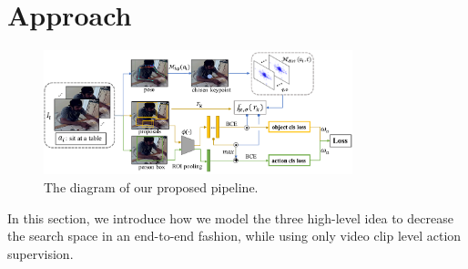 \section{Approach}
\label{sec:approach}

\begin{figure}[ht!]
\centering
\includegraphics[width=0.8\textwidth]{figures/pipeline.pdf}
\caption{The diagram of our proposed pipeline.}
\label{fig:pipeline}
\end{figure}
In this section, we introduce how we model the three high-level idea to decrease the search space in an end-to-end fashion, while using only video clip level action supervision.
